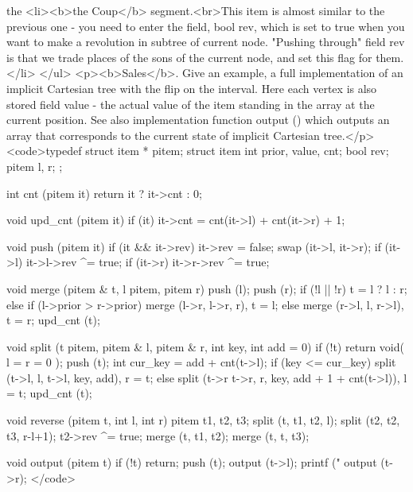 the <li><b>the Coup</b> segment.<br>This item is almost similar to the previous one - you need to enter the field, bool rev, which is set to true when you want to make a revolution in subtree of current node. "Pushing through" field rev is that we trade places of the sons of the current node, and set this flag for them.</li>
</ul>
<p><b>Sales</b>. Give an example, a full implementation of an implicit Cartesian tree with the flip on the interval. Here each vertex is also stored field value - the actual value of the item standing in the array at the current position. See also implementation function output () which outputs an array that corresponds to the current state of implicit Cartesian tree.</p>
<code>typedef struct item * pitem;
struct item {
int prior, value, cnt;
bool rev;
pitem l, r;
};

int cnt (pitem it) {
return it ? it->cnt : 0;
}

void upd_cnt (pitem it) {
if (it)
it->cnt = cnt(it->l) + cnt(it->r) + 1;
}

void push (pitem it) {
if (it && it->rev) {
it->rev = false;
swap (it->l, it->r);
if (it->l) it->l->rev ^= true;
if (it->r) it->r->rev ^= true;
}
}

void merge (pitem & t, l pitem, pitem r) {
push (l);
push (r);
if (!l || !r)
t = l ? l : r;
else if (l->prior > r->prior)
merge (l->r, l->r, r), t = l;
else
merge (r->l, l, r->l), t = r;
upd_cnt (t);
}

void split (t pitem, pitem & l, pitem & r, int key, int add = 0) {
if (!t)
return void( l = r = 0 );
push (t);
int cur_key = add + cnt(t->l);
if (key <= cur_key)
split (t->l, l, t->l, key, add), r = t;
else
split (t->r t->r, r, key, add + 1 + cnt(t->l)), l = t;
upd_cnt (t);
}

void reverse (pitem t, int l, int r) {
pitem t1, t2, t3;
split (t, t1, t2, l);
split (t2, t2, t3, r-l+1);
t2->rev ^= true;
merge (t, t1, t2);
merge (t, t, t3);
}

void output (pitem t) {
if (!t) return;
push (t);
output (t->l);
printf ("%
output (t->r);
}</code>